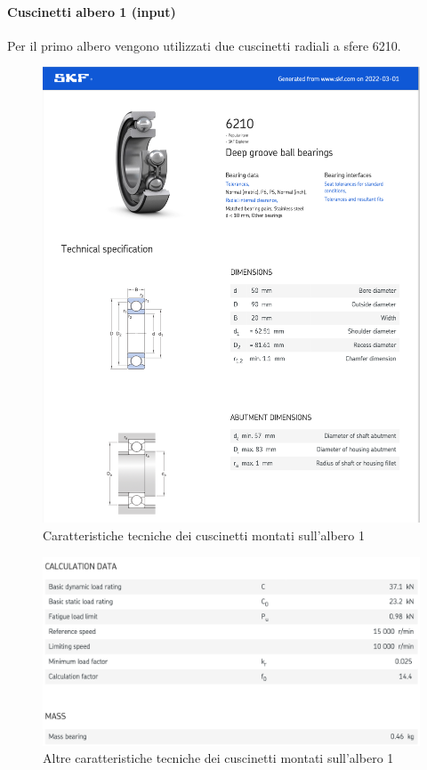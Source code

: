 \paragraph{Cuscinetti albero 1 (input)}
Per il primo albero vengono utilizzati due cuscinetti radiali a sfere 6210. 
\begin{figure}[h]
    \centering
    \includegraphics[scale=0.5]{Immagini/Cuscinetti1Albero1.png}
    \caption{Caratteristiche tecniche dei cuscinetti montati sull'albero 1}
    \label{fig:Cuscinetto1Albero1}
\end{figure}
\begin{figure}[h]
    \centering
    \includegraphics[scale=0.5]{Immagini/Cuscinetti2Albero1.png}
    \caption{Altre caratteristiche tecniche dei cuscinetti montati sull'albero 1}
    \label{fig:Cuscineti2Albero1}
\end{figure}

